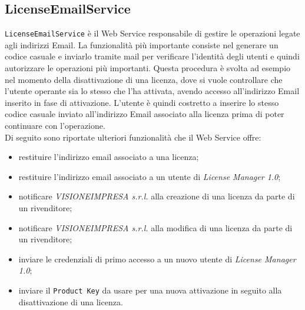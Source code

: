 \subsection{LicenseEmailService}
\texttt{LicenseEmailService} è il Web Service responsabile di gestire le operazioni legate agli indirizzi Email. La funzionalità più importante consiste nel generare un codice casuale e inviarlo tramite mail per verificare l'identità degli utenti e quindi autorizzare le operazioni più importanti. Questa procedura è svolta ad esempio nel momento della disattivazione di una licenza, dove si vuole controllare che l'utente operante sia lo stesso che l'ha attivata, avendo accesso all'indirizzo Email inserito in fase di attivazione. L'utente è quindi costretto a inserire lo stesso codice casuale inviato all'indirizzo Email associato alla licenza prima di poter continuare con l'operazione.\\
Di seguito sono riportate ulteriori funzionalità che il Web Service offre:
\begin{itemize}
\item restituire l'indirizzo email associato a una licenza;
\item restituire l'indirizzo email associato a un utente di \textit{License Manager 1.0};
\item notificare \textit{VISIONEIMPRESA s.r.l.} alla creazione di una licenza da parte di un rivenditore;
 \item notificare \textit{VISIONEIMPRESA s.r.l.} alla modifica di una licenza da parte di un rivenditore;
 \item inviare le credenziali di primo accesso a un nuovo utente di \textit{License Manager 1.0};
 \item inviare il \texttt{Product Key} da usare per una nuova attivazione in seguito alla disattivazione di una licenza.
\end{itemize}

